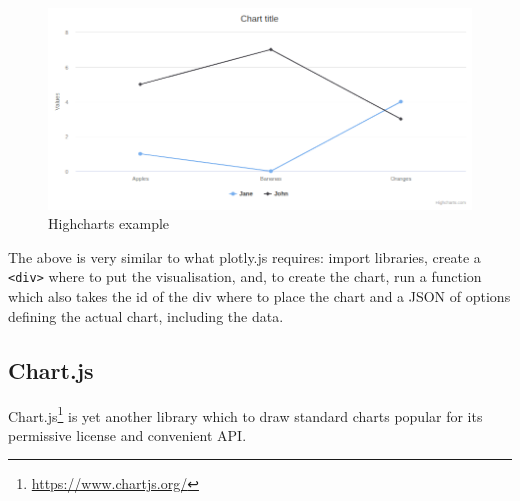 \documentclass[
]{krantz}
\renewcommand{\href}[2]{#2\footnote{\url{#1}}}
\begin{document}
\begin{figure}
\centering
\includegraphics{images/candidate-highcharts.png}
\caption{Highcharts example}
\end{figure}

The above is very similar to what plotly.js requires: import libraries, create a \texttt{\textless{}div\textgreater{}} where to put the visualisation, and, to create the chart, run a function which also takes the id of the div where to place the chart and a JSON of options defining the actual chart, including the data.

\hypertarget{widgets-basics-candidates-chart.js}{%
\subsection{Chart.js}\label{widgets-basics-candidates-chart.js}}

\href{https://www.chartjs.org/}{Chart.js} is yet another library which to draw standard charts popular for its permissive license and convenient API.
\end{document}
